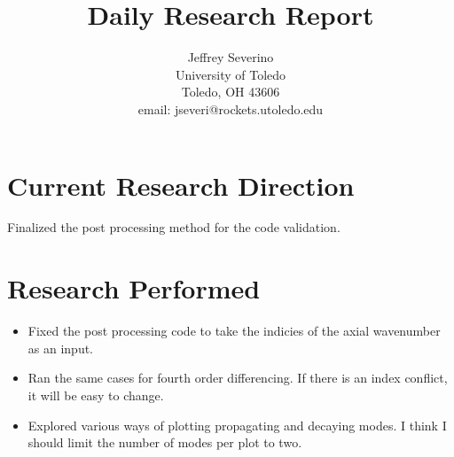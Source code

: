 \documentclass[a4paper]{article}
\begin{document}
\begin{titlepage}

    \title{
    Daily Research Report}

    \author{ Jeffrey Severino \\
        University of Toledo \\
        Toledo, OH  43606 \\
    email: jseveri@rockets.utoledo.edu}


    \maketitle

\end{titlepage}
\section{Current Research Direction}
Finalized the post processing method for the code validation.
\section{Research Performed}

\begin{itemize}
    \item Fixed the post processing code to take the indicies of the axial wavenumber as an
input. 
\item Ran the same cases for fourth order differencing. If there is an index conflict, it
    will be easy to change.
\item Explored various ways of plotting propagating and decaying modes. I think
    I should limit the number of modes per plot to two. 
\end{itemize}
\end{document}
